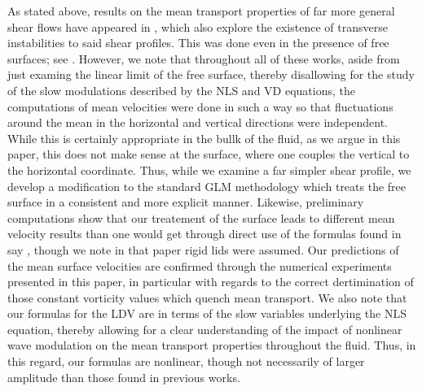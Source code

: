 \documentclass{JFM_Style/jfm}
\begin{document}
As stated above, results on the mean transport properties of far more general shear flows have appeared in \cite{craik2, craik3, phillips1, phillips2}, which also explore the existence of transverse instabilities to said shear profiles.  This was done even in the presence of free surfaces; see \cite{phillips1,phillips2}.  However, we note that throughout all of these works, aside from just examing the linear limit of the free surface, thereby disallowing for the study of the slow modulations described by the NLS and VD equations, the computations of mean velocities were done in such a way so that fluctuations around the mean in the horizontal and vertical directions were independent.  While this is certainly appropriate in the bullk of the fluid, as we argue in this paper, this does not make sense at the surface, where one couples the vertical to the horizontal coordinate.  Thus, while we examine a far simpler shear profile, we develop a modification to the standard GLM methodology which treats the free surface in a consistent and more explicit manner.  Likewise, preliminary computations show that our treatement of the surface leads to different mean velocity results than one would get through direct use of the formulas found in say \cite{craik2}, though we note in that paper rigid lids were assumed.  Our predictions of the mean surface velocities are confirmed through the numerical experiments presented in this paper, in particular with regards to the correct dertimination of those constant vorticity values which quench mean transport.  We also note that our formulas for the LDV are in terms of the slow variables underlying the NLS equation, thereby allowing for a clear understanding of the impact of nonlinear wave modulation on the mean transport properties throughout the fluid.  Thus, in this regard, our formulas are nonlinear, though not necessarily of larger amplitude than those found in previous works.  
\end{document}
